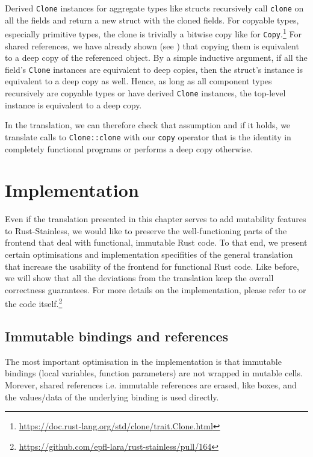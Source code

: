 Derived \passthrough{\lstinline!Clone!} instances for aggregate types like
structs recursively call \passthrough{\lstinline!clone!} on all the fields and
return a new struct with the cloned fields. For copyable types, especially
primitive types, the clone is trivially a bitwise copy like for
\lstinline!Copy!.\footnote{\url{https://doc.rust-lang.org/std/clone/trait.Clone.html}}
For shared references, we have already shown (see
) that copying them is equivalent to a deep
copy of the referenced object. By a simple inductive argument, if all the
field's \passthrough{\lstinline!Clone!} instances are equivalent to deep copies,
then the struct's instance is equivalent to a deep copy as well. Hence, as long
as all component types recursively are copyable types or have derived
\passthrough{\lstinline!Clone!} instances, the top-level instance is equivalent
to a deep copy.

In the translation, we can therefore check that assumption and if it
holds, we translate calls to \passthrough{\lstinline!Clone::clone!} with
our \passthrough{\lstinline!copy!} operator that is the identity in
completely functional programs or performs a deep copy otherwise.




\section{Implementation}

Even if the translation presented in this chapter serves to add mutability
features to Rust-Stainless, we would like to preserve the well-functioning parts
of the frontend that deal with functional, immutable Rust code. To that end, we
present certain optimisations and implementation specifities of the general
translation  that increase the usability of the frontend for functional Rust
code. Like before, we will show that all the deviations from the translation
keep the overall correctness guarantees. For more details on the implementation,
please refer to  or the code
itself.\footnote{\url{https://github.com/epfl-lara/rust-stainless/pull/164}}

\subsection{Immutable bindings and references}

The most important optimisation in the implementation is that immutable bindings
(local variables, function parameters) are not wrapped in mutable cells.
Morever, shared references i.e. immutable references are erased, like boxes, and
the values/data of the underlying binding is used directly.


